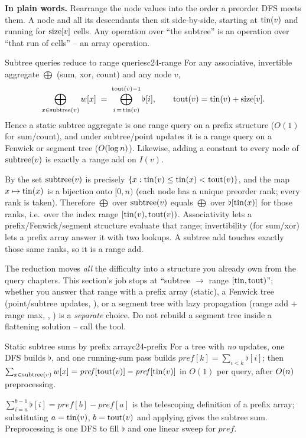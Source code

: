 \noindent\textbf{In plain words.} Rearrange the node values into the order a preorder DFS
meets them. A node and all its descendants then sit side-by-side, starting at $\operatorname{tin}(v)$ and
running for $\operatorname{size}[v]$ cells. Any operation over ``the subtree'' is an operation over ``that
run of cells'' -- an array operation.

\begin{theorem}{Subtree queries reduce to range queries}{c24-range}
For any associative, invertible aggregate $\bigoplus$ (sum, xor, count) and any node $v$,
\[
   \bigoplus_{x \in \operatorname{subtree}(v)} w[x] \;=\; \bigoplus_{i\,=\,\operatorname{tin}(v)}^{\operatorname{tout}(v)-1} \flat[i],
   \qquad \operatorname{tout}(v)=\operatorname{tin}(v)+\operatorname{size}[v].
\]
Hence a static subtree aggregate is one range query on a prefix structure ($O(1)$ for
sum/count), and under subtree/point updates it is a range query on a Fenwick or segment tree
($O(\log n)$). Likewise, adding a constant to every node of $\operatorname{subtree}(v)$ is exactly a
range add on $I(v)$.
\end{theorem}
\begin{proofbox}
By  the set $\operatorname{subtree}(v)$ is precisely $\{x : \operatorname{tin}(v) \le \operatorname{tin}(x) <
\operatorname{tout}(v)\}$, and the map $x \mapsto \operatorname{tin}(x)$ is a bijection onto $[0,n)$ (each node has a
unique preorder rank; every rank is taken). Therefore $\bigoplus$ over $\operatorname{subtree}(v)$ equals
$\bigoplus$ over $\flat[\operatorname{tin}(x)]$ for those ranks, i.e.\ over the index range
$[\operatorname{tin}(v), \operatorname{tout}(v))$. Associativity lets a prefix/Fenwick/segment structure evaluate that
range; invertibility (for sum/xor) lets a prefix array answer it with two lookups. A subtree
add touches exactly those same ranks, so it is a range add.
\end{proofbox}
\begin{insightbox}
The reduction moves \emph{all} the difficulty into a structure you already own from the query
chapters. This section's job stops at ``subtree $\to$ range $[\operatorname{tin}, \operatorname{tout})$''; whether you
answer that range with a prefix array (static), a Fenwick tree (point/subtree updates,
), or a segment tree with lazy propagation (range add + range max, ,
) is a \emph{separate} choice. Do not rebuild a segment tree inside a flattening
solution -- call the tool.
\end{insightbox}

\begin{proposition}{Static subtree sums by prefix array}{c24-prefix}
For a tree with \emph{no} updates, one DFS builds $\flat$, and one running-sum pass builds
$\mathit{pref}[k]=\sum_{i<k}\flat[i]$; then $\sum_{x\in\operatorname{subtree}(v)} w[x]=\mathit{pref}[\operatorname{tout}(v)]-\mathit{pref}[\operatorname{tin}(v)]$
in $O(1)$ per query, after $O(n)$ preprocessing.
\end{proposition}
\begin{proofbox}
$\sum_{i=a}^{b-1}\flat[i] = \mathit{pref}[b]-\mathit{pref}[a]$ is the telescoping definition
of a prefix array; substituting $a=\operatorname{tin}(v)$, $b=\operatorname{tout}(v)$ and applying 
gives the subtree sum. Preprocessing is one DFS to fill $\flat$ and one linear sweep for
$\mathit{pref}$.
\end{proofbox}

